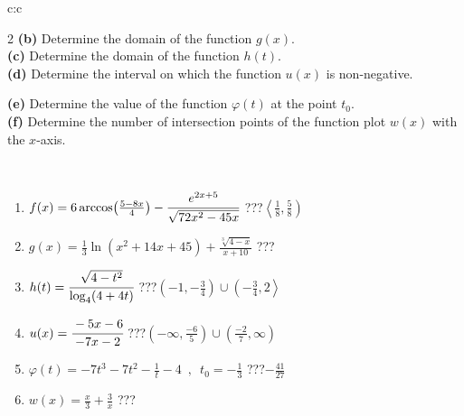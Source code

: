 \documentclass[10pt]{report}
\begin{document}
\begin{tabular}{c:c}
\begin{minipage}[c][104.5mm][t]{0.5\linewidth}
\begin{center}
\begin{minipage}{0.95\linewidth}
\begin{center}
{\begin{multicols}{2}
\textbf{(b)} Determine the domain of the function \(g(x)\). \\[1mm]
\textbf{(c)} Determine the domain of the function \(h(t)\). \\[1mm]
\textbf{(d)} Determine the interval on which the function \(u(x)\) is non-negative. \par \columnbreak
\textbf{(e)} Determine the value of the function \(\varphi(t)\) at the point \(t_0\). \\[1mm]
\textbf{(f)} Determine the number of intersection points of the function plot \(w(x)\) with the \(x\)-axis. \\[1mm]
\end{multicols}
}
\end{center}
\end{minipage}
\\[4mm]
\begin{minipage}{0.79\linewidth}
\begin{center}
\begin{varwidth}{\linewidth}
\begin{enumerate}
\small
\item $f(x) = 6\arccos\!\left( \frac{5-8x}{4} \right) - \cfrac{e^{2x+5}}{\sqrt{72x^2-45x}}$\quad \dotfill\; ???\;\dotfill \quad $\left\langle\frac{1}{8} , \frac{5}{8}\right)$
\item $g(x) = \frac{1}{3} \ln{\!(x^2+14x+45)}+\frac{\sqrt[3]{4-x}}{x+10}$\quad \dotfill\; ???\;\dotfill {}
\item $h(t) = \cfrac{\sqrt{4-t^2}}{\log_4(4+4t)}$\quad \dotfill\; ???\;\dotfill \quad $\left(-1 , -\frac{3}{4}\right)\cup\left(-\frac{3}{4} , 2\right\rangle$
\item $u(x) = \cfrac{-5x-6}{-7x-2}$\quad \dotfill\; ???\;\dotfill \quad $\left(-\infty , \frac{-6}{5}\right)\cup\left(\frac{-2}{7} , \infty\right)$
\item $\varphi(t) = -7t^3-7t^2-\frac{1}{t}-4 \enspace , \enspace t_0=-\frac{1}{3}$\quad \dotfill\; ???\;\dotfill \quad $-\frac{41}{27}$
\item $w(x) = \frac{x}{3}+\frac{3}{x}$\quad \dotfill\; ???\;\dotfill {}
\end{enumerate}
\end{varwidth}
\end{center}
\end{minipage}
\begin{minipage}{0.20\linewidth}
\begin{center}

\end{center}
\end{minipage}
\end{center}
\end{minipage}
\end{tabular}
\end{document}
